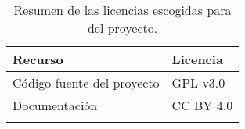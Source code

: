\begin{longtable}[]{@{}ll@{}}
\toprule 
\begin{minipage}[b]{0.50\columnwidth}\raggedright\strut
Recurso\strut
\end{minipage} & \begin{minipage}[b]{0.21\columnwidth}\raggedright\strut
Licencia\strut
\end{minipage}\tabularnewline
\midrule
\endhead
\begin{minipage}[t]{0.50\columnwidth}\raggedright\strut
Código fuente del proyecto\strut
\end{minipage} & \begin{minipage}[t]{0.21\columnwidth}\raggedright\strut
GPL v3.0\strut
\end{minipage}\tabularnewline
\begin{minipage}[t]{0.50\columnwidth}\raggedright\strut
Documentación\strut
\end{minipage} & \begin{minipage}[t]{0.21\columnwidth}\raggedright\strut
CC BY 4.0\strut
\end{minipage}\tabularnewline
\bottomrule
\caption{Resumen de las licencias escogidas para del proyecto.}
\label{resumelicense}
\end{longtable}


